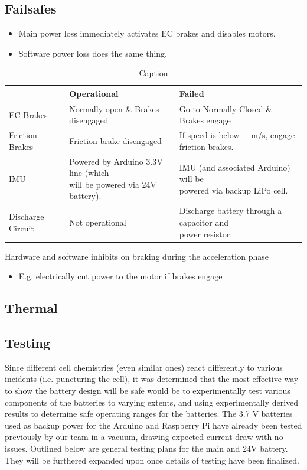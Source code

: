 \documentclass{report}
\begin{document}
    \subsection{Failsafes}
    \begin{itemize}
        \item Main power loss immediately activates EC brakes and disables motors.
        \item Software power loss does the same thing.
    \end{itemize}
    \begin{table}[H]
        \centering
        \begin{tabular}{@{}lll@{}} \toprule
            & Operational & Failed\\ \midrule
            EC Brakes & Normally open \& Brakes disengaged & Go to Normally Closed \& Brakes engage\\
            Friction Brakes & Friction brake disengaged & If speed is below \_ m/s, engage friction brakes.\\
            IMU & \makecell[l]{Powered by Arduino 3.3V line (which \\ will be powered via 24V battery).} & \makecell[l]{IMU (and associated Arduino) will be \\ powered via backup LiPo cell.}\\
            Discharge Circuit & Not operational & \makecell[l]{Discharge battery through a capacitor and \\ power resistor.}\\ \bottomrule
        \end{tabular}
        \caption{Caption}
    \end{table}
    Hardware and software inhibits on braking during the acceleration phase
    \begin{itemize}
        \item E.g. electrically cut power to the motor if brakes engage
    \end{itemize}
    \subsection{Thermal}
    \subsection{Testing}
    Since different cell chemistries (even similar ones) react differently to various incidents (i.e. puncturing the cell), it was determined that the most effective way to show the battery design will be safe would be to experimentally test various components of the batteries to varying  extents, and using experimentally derived results to determine safe operating ranges for the batteries. The 3.7 V batteries used as backup power for the Arduino and Raspberry Pi have already been tested previously by our team in a vacuum, drawing expected current draw with no issues. Outlined below are general testing plans for the main and 24V battery. They will be furthered expanded upon once details of testing have been finalized.
\end{document}
